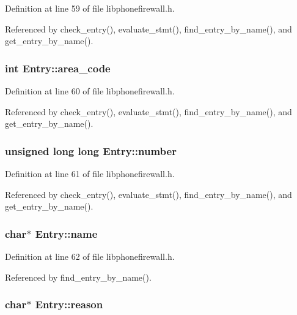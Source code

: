 Definition at line 59 of file libphonefirewall.h.

Referenced by check\_\-entry(), evaluate\_\-stmt(), find\_\-entry\_\-by\_\-name(), and get\_\-entry\_\-by\_\-name().\hypertarget{structEntry_9de7b96e5b65796bd35e9dc730dcd8b3}{
\subsubsection{\setlength{\rightskip}{0pt plus 5cm}int {\bf Entry::area\_\-code}}}
\label{structEntry_9de7b96e5b65796bd35e9dc730dcd8b3}




Definition at line 60 of file libphonefirewall.h.

Referenced by check\_\-entry(), evaluate\_\-stmt(), find\_\-entry\_\-by\_\-name(), and get\_\-entry\_\-by\_\-name().\hypertarget{structEntry_1f2177afed89936f82c130ae13fb107c}{
\subsubsection{\setlength{\rightskip}{0pt plus 5cm}unsigned long long {\bf Entry::number}}}
\label{structEntry_1f2177afed89936f82c130ae13fb107c}




Definition at line 61 of file libphonefirewall.h.

Referenced by check\_\-entry(), evaluate\_\-stmt(), find\_\-entry\_\-by\_\-name(), and get\_\-entry\_\-by\_\-name().\hypertarget{structEntry_272e382d3efed5f970c7939742ec9603}{
\subsubsection{\setlength{\rightskip}{0pt plus 5cm}char$\ast$ {\bf Entry::name}}}
\label{structEntry_272e382d3efed5f970c7939742ec9603}




Definition at line 62 of file libphonefirewall.h.

Referenced by find\_\-entry\_\-by\_\-name().\hypertarget{structEntry_2082cdbb815dfa8b81309cd395d32986}{
\subsubsection{\setlength{\rightskip}{0pt plus 5cm}char$\ast$ {\bf Entry::reason}}}
\label{structEntry_2082cdbb815dfa8b81309cd395d32986}





